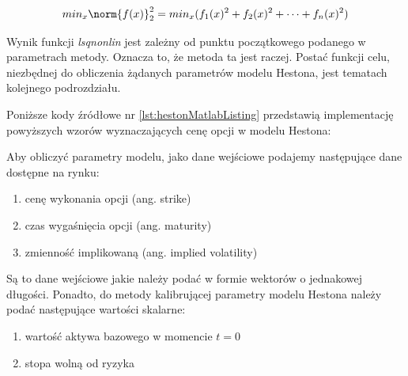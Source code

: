 \documentclass{pracamgr}
\begin{document}
\begin{equation}
  min_x \norm{f(x)}^2_2 = min_x(f_1(x)^2 + f_2(x)^2 + \cdots + f_n(x)^2)
\end{equation}


Wynik funkcji \textit{lsqnonlin} jest zależny od punktu początkowego podanego w parametrach metody. Oznacza to, że 
metoda ta jest raczej. Postać funkcji celu, niezbędnej do obliczenia żądanych parametrów modelu Hestona, 
jest tematach kolejnego podrozdziału.



Poniższe kody źródłowe nr \ref{lst:hestonMatlabListing} \cite{HestonMatlab} przedstawią implementację powyższych wzorów wyznaczających cenę opcji w modelu Hestona:






Aby obliczyć parametry modelu, jako dane wejściowe podajemy następujące dane dostępne na rynku:
\begin{enumerate}
  \item cenę wykonania opcji (ang. strike)
  \item czas wygaśnięcia opcji (ang. maturity)
  \item zmienność implikowaną (ang. implied volatility)
\end{enumerate}
Są to dane wejściowe jakie należy podać w formie wektorów o jednakowej długości.
Ponadto, do metody kalibrującej parametry modelu Hestona należy podać następujące 
wartości skalarne:
\begin{enumerate}
  \item wartość aktywa bazowego w momencie $t=0$
  \item stopa wolną od ryzyka
\end{enumerate}
\end{document}
